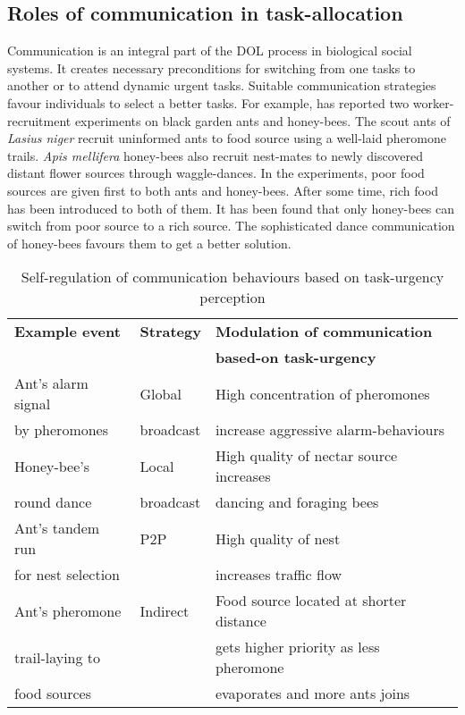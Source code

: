 \subsection{Roles of communication in task-allocation}
\label{bg:bio-comm:comm-role}
Communication is an integral part of the DOL process in biological social systems. It creates necessary  preconditions for switching from one tasks to another or to attend dynamic urgent tasks. Suitable communication strategies favour individuals to select a better tasks. For example,  has reported two worker-recruitment experiments on black garden ants and honey-bees. The scout ants of {\em Lasius niger}  recruit uninformed ants to food source using a well-laid pheromone trails. {\em Apis mellifera} honey-bees also recruit nest-mates to newly discovered distant flower sources through waggle-dances. In the experiments,  poor food sources are given first to both ants and honey-bees. After some time,  rich food has been introduced  to both of them. It has been found that only honey-bees can switch from poor source to a rich source. The sophisticated dance communication of honey-bees favours them to get a better solution. \\
\begin{table}
\caption{Self-regulation of communication behaviours based on task-urgency perception}
\label{table:bio-comm-task-urgency}
\begin{center}
\begin{tabular}{|l|l|l|}
\hline \textbf{Example event} & \textbf{Strategy} & \textbf{Modulation of communication}\\
&  &  \textbf{based-on task-urgency}\\
\hline Ant's alarm signal &  Global  & High concentration of pheromones\\
by pheromones & broadcast &  increase aggressive alarm-behaviours \\                                                                                                                                               
\hline Honey-bee's  & Local  &  High quality of nectar source increases \\
round dance & broadcast & dancing and foraging bees\\
\hline Ant's tandem run     & P2P & High quality of nest \\
for nest selection & &   increases traffic flow\\
\hline Ant's pheromone   & Indirect & Food source located at shorter distance\\
trail-laying to   & &  gets higher priority as less pheromone \\
food sources & & evaporates and more ants joins\\
\hline
\end{tabular}
\end{center}
\end{table}
